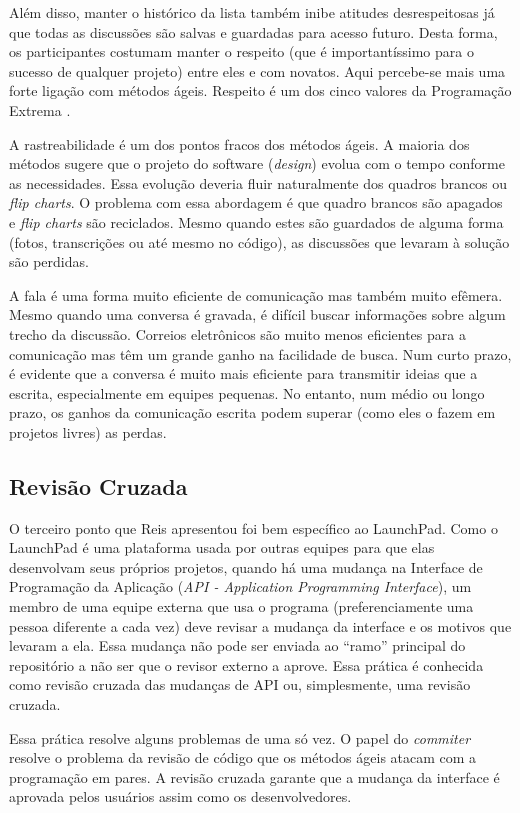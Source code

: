 Além disso, manter o histórico da lista também inibe atitudes
desrespeitosas já que todas as discussões são salvas e guardadas para
acesso futuro. Desta forma, os participantes costumam manter o
respeito (que é importantíssimo para o sucesso de qualquer projeto)
entre eles e com novatos. Aqui percebe-se mais uma forte ligação com
métodos ágeis. Respeito é um dos cinco valores da Programação Extrema
\cite{XP02}.

A rastreabilidade é um dos pontos fracos dos métodos ágeis. A maioria
dos métodos sugere que o projeto do software (\emph{design}) evolua
com o tempo conforme as necessidades. Essa evolução deveria fluir
naturalmente dos quadros brancos ou \emph{flip charts}. O problema com
essa abordagem é que quadro brancos são apagados e \emph{flip charts}
são reciclados.  Mesmo quando estes são guardados de alguma forma
(fotos, transcrições ou até mesmo no código), as discussões que
levaram à solução são perdidas.

A fala é uma forma muito eficiente de comunicação mas também muito
efêmera. Mesmo quando uma conversa é gravada, é difícil buscar
informações sobre algum trecho da discussão. Correios eletrônicos são
muito menos eficientes para a comunicação mas têm um grande ganho na
facilidade de busca. Num curto prazo, é evidente que a conversa é
muito mais eficiente para transmitir ideias que a escrita,
especialmente em equipes pequenas. No entanto, num médio ou longo
prazo, os ganhos da comunicação escrita podem superar (como eles o
fazem em projetos livres) as perdas.

\subsection{Revisão Cruzada}
\label{subsec:crossrev}

O terceiro ponto que Reis apresentou foi bem específico ao
LaunchPad. Como o LaunchPad é uma plataforma usada por outras equipes
para que elas desenvolvam seus próprios projetos, quando há uma
mudança na Interface de Programação da Aplicação (\emph{API -
  Application Programming Interface}), um membro de uma equipe externa
que usa o programa (preferenciamente uma pessoa diferente a cada vez)
deve revisar a mudança da interface e os motivos que levaram a
ela. Essa mudança não pode ser enviada ao ``ramo'' principal do
repositório a não ser que o revisor externo a aprove. Essa prática é
conhecida como revisão cruzada das mudanças de API ou, simplesmente,
uma revisão cruzada.

Essa prática resolve alguns problemas de uma só vez. O papel do
\emph{commiter} resolve o problema da revisão de código que os métodos
ágeis atacam com a programação em pares. A revisão cruzada garante que
a mudança da interface é aprovada pelos usuários assim como os
desenvolvedores.

